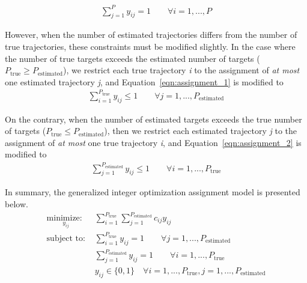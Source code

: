 \begin{align}\label{eqn:assignment_2}
\sum_{j=1}^{P} y_{ij} = 1 \qquad \forall i = 1,...,P
\end{align}

However, when the number of estimated trajectories differs from the number of true trajectories, these constraints must be modified slightly. In the case where the number of true targets exceeds the estimated number of targets ($P_{\text{true}}\geq P_{\text{estimated}}$), we restrict each true trajectory \textit{i} to the assignment of \textit{at most} one estimated trajectory \textit{j}, and Equation~\ref{eqn:assignment_1} is modified to
\begin{align}
\sum_{i=1}^{P_{\text{true}}} y_{ij} \leq 1 \qquad \forall  j = 1,...,P_{\text{estimated}}
\end{align}

On the contrary, when the number of estimated targets exceeds the true number of targets ($P_{\text{true}}\leq P_{\text{estimated}}$), then we restrict each estimated trajectory \textit{j} to the assignment of \textit{at most} one true trajectory \textit{i}, and Equation~\ref{eqn:assignment_2} is modified to
\begin{align}
\sum_{j=1}^{P_{\text{estimated}}} y_{ij} \leq 1 \qquad \forall i = 1,...,P_{\text{true}}
\end{align}

In summary, the generalized integer optimization assignment model is presented below.  
\begin{align}
\underset{y_{ij}}{\text{minimize: }} & \sum_{i=1}^{P_{\text{true}}} \sum_{j=1}^{P_{\text{estimated}}} c_{ij}y_{ij}\\
\text{subject to: }	& \sum_{i=1}^{P_{\text{true}}} y_{ij} = 1 \qquad \forall j = 1,...,P_{\text{estimated}} \nonumber \\
				& \sum_{j=1}^{P_{\text{estimated}}} y_{ij} = 1 \qquad \forall i = 1,...,P_{\text{true}} \nonumber \\
				& y_{ij} \in \{0,1\} \quad \forall i = 1,...,P_{\text{true}},j = 1,...,P_{\text{estimated}} \nonumber
\end{align}


